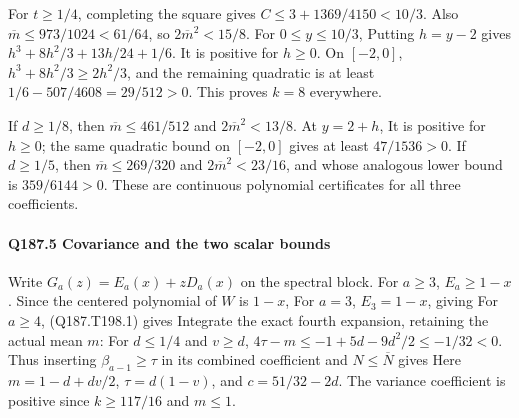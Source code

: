 For $t\ge1/4$, completing the square gives
$C\le3+1369/4150<10/3$. Also
$\overline m\le973/1024<61/64$, so $2\overline m^2<15/8$.
For $0\le y\le10/3$,
Putting $h=y-2$ gives $h^3+8h^2/3+13h/24+1/6$.
It is positive for $h\ge0$. On $[-2,0]$,
$h^3+8h^2/3\ge2h^2/3$, and the remaining quadratic is at least
$1/6-507/4608=29/512>0$. This proves $k=8$ everywhere.

If $d\ge1/8$, then $\overline m\le461/512$ and
$2\overline m^2<13/8$. At $y=2+h$,
It is positive for $h\ge0$; the same quadratic bound on $[-2,0]$
gives at least $47/1536>0$. If $d\ge1/5$, then
$\overline m\le269/320$ and $2\overline m^2<23/16$, and
whose analogous lower bound is $359/6144>0$.
These are continuous polynomial certificates for all three coefficients.

\paragraph{Q187.5 Covariance and the two scalar bounds}
Write $G_a(z)=E_a(x)+zD_a(x)$ on the spectral block. For $a\ge3$,
$E_a\ge1-x$. Since the centered polynomial of $W$ is $1-x$,
For $a=3$, $E_3=1-x$, giving
For $a\ge4$, (Q187.T198.1) gives
Integrate the exact fourth expansion, retaining the actual mean $m$:
For $d\le1/4$ and $v\ge d$,
$4\tau-m\le-1+5d-9d^2/2\le-1/32<0$.
Thus inserting $\beta_{a-1}\ge\tau$ in its combined coefficient
and $N\le\overline N$ gives
Here $m=1-d+dv/2$, $\tau=d(1-v)$, and $c=51/32-2d$.
The variance coefficient is positive since $k\ge117/16$ and $m\le1$.


